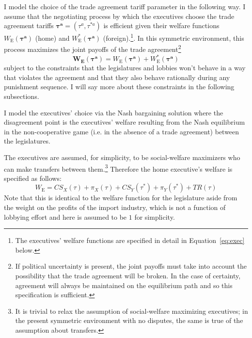 \documentclass[authoryear, review]{elsarticle}
\newcommand{\bta}{\bm{\tau^a}}
\begin{document}
I model the choice of the trade agreement tariff parameter in the following way. I assume that the negotiating process by which the executives choose the trade agreement tariffs $\bta=\left(\tau^a,\tau^{*a} \right)$ is efficient given their welfare functions $W_\text{E}(\bta)$ (home) and $W_\text{E}^*(\bta)$ (foreign).\footnote{The executives' welfare functions are specified in detail in Equation~\ref{eq:exec} below.}. In this symmetric environment, this process maximizes the joint payoffs of the trade agreement\footnote{If political uncertainty is present, the joint payoffs must take into account the possibility that the trade agreement will be broken. In the case of certainty, agreement will always be maintained on the equilibrium path and so this specification is sufficient.}
\begin{equation}
  \bm{W_\text{E}}(\bta) = W_\text{E}(\bta) + W_\text{E}^*(\bta)
  \label{eq:jv3}
\end{equation}
subject to the constraints that the legislatures and lobbies won't behave in a way that violates the agreement and that they also behave rationally during any punishment sequence. I will say more about these constraints in the following subsections.

I model the executives' choice via the Nash bargaining solution where the disagreement point is the executives' welfare resulting from the Nash equilibrium in the non-cooperative game (i.e. in the absence of a trade agreement) between the legislatures.

The executives are assumed, for simplicity, to be social-welfare maximizers who can make transfers between them.\footnote{It is trivial to relax the assumption of social-welfare maximizing executives; in the present symmetric environment with no disputes, the same is true of the assumption about transfers.} Therefore the home executive's welfare is specified as follows:
\begin{equation}
  W_\text{E} = \mathit{CS}_X(\tau) + \pi_X(\tau) + \mathit{CS}_Y(\tau^*) + \pi_Y(\tau^*) + \mathit{TR}(\tau)
	\label{eq:exec}
\end{equation}
Note that this is identical to the welfare function for the legislature aside from the weight on the profits of the import industry, which is not a function of lobbying effort and here is assumed to be $1$ for simplicity. 
\end{document}
